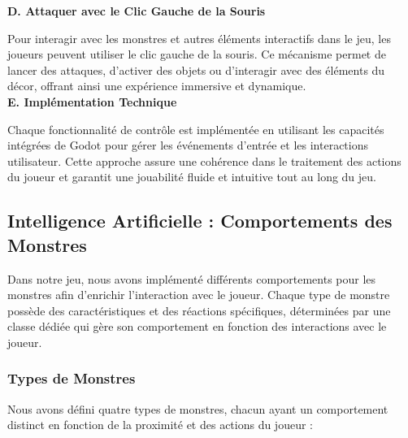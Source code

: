 \textbf{D. Attaquer avec le Clic Gauche de la Souris}
\vspace*{0.2cm}

Pour interagir avec les monstres et autres éléments interactifs dans le jeu, les joueurs peuvent utiliser le clic gauche de la souris.
Ce mécanisme permet de lancer des attaques, d'activer des objets ou d'interagir avec des éléments du décor, offrant ainsi une expérience immersive et dynamique.
\\

\textbf{E. Implémentation Technique}
\vspace*{0.2cm}

Chaque fonctionnalité de contrôle est implémentée en utilisant les capacités intégrées de Godot pour gérer les événements d'entrée et les interactions utilisateur.
Cette approche assure une cohérence dans le traitement des actions du joueur et garantit une jouabilité fluide et intuitive tout au long du jeu.

\subsection{Intelligence Artificielle : Comportements des Monstres}

Dans notre jeu, nous avons implémenté différents comportements pour les monstres afin d'enrichir l'interaction avec le joueur.
Chaque type de monstre possède des caractéristiques et des réactions spécifiques, déterminées par une classe dédiée qui gère son comportement en fonction des interactions avec le joueur.

\subsubsection{Types de Monstres}

Nous avons défini quatre types de monstres, chacun ayant un comportement distinct en fonction de la proximité et des actions du joueur :
\\


